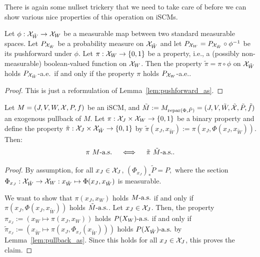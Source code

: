 There is again some nullset trickery that we need to take care of before we can show various nice properties of this operation on iSCMs.
\begin{Lem}\label{lem:pullback_as}
  Let $\phi : \mathcal{X}_{\tilde W} \to \mathcal{X}_W$ be a measurable map between two standard measurable spaces. 
  Let $P_{\mathcal{X}_{\tilde{W}}}$ be a probability measure on $\mathcal{X}_{\tilde{W}}$ and let $P_{\mathcal{X}_W} = P_{\mathcal{X}_{\tilde W}} \circ \phi^{-1}$ be its pushforward under $\phi$. 
  Let $\pi:\mathcal{X}_W\to\{0,1\}$ be a property, i.e., a (possibly non-measurable) boolean-valued function on $\mathcal{X}_W$. 
  Then the property $\tilde\pi = \pi\circ\phi$ on $\mathcal{X}_{\tilde{W}}$ holds $P_{\mathcal{X}_{\tilde{W}}}$-a.e.\ if and only if the property $\pi$ holds $P_{\mathcal{X}_W}$-a.e..
\end{Lem}
\begin{proof}
  This is just a reformulation of Lemma~\ref{lem:pushforward_as}.
\end{proof}
\begin{Cor}\label{cor:exog_pullback_as}
  Let $M = \left ( J, V, W, \mathcal{X}, P, f \right )$ be an iSCM, and $\tilde{M} := M_{\mathrm{repar}({\Phi},{\tilde{P}})} = ( J, V, \tilde{W}, \tilde{\mathcal{X}}, \tilde{P}, \tilde{f} )$ an exogenous pullback of $M$.
  Let $\pi : \mathcal{X}_J \times \mathcal{X}_W \to \{0,1\}$ be a binary property and define the property $\tilde\pi : \mathcal{X}_J \times \mathcal{X}_{\tilde{W}} \to \{0,1\}$ by $\tilde\pi(x_J,x_{\tilde{W}}) := \pi(x_J,\Phi(x_J,x_{\tilde W}))$.
  Then:
  $$\pi\ M\as \quad\iff\quad \tilde\pi\ \tilde{M}\as.$$
  \TODOmas
\end{Cor}
\begin{proof}
  By assumption, for all $x_J \in \mathcal{X}_J$, $(\Phi_{x_J})_* \tilde{P} = P,$ where the section $\Phi_{x_J} : \mathcal{X}_{\tilde{W}} \to \mathcal{X}_W : x_{\tilde W} \mapsto \Phi(x_J,x_{\tilde W})$ is measurable. 

  We want to show that
  $\pi(x_J,x_W)$ holds $M\text{-a.s.}$ if and only if $\pi(x_J,\Phi(x_J,x_{\tilde W}))$ holds $\tilde{M}\text{-a.s.}$.
  Let $x_J \in \mathcal{X}_J$.
  Then, the property $\pi_{x_J} := (x_W \mapsto \pi(x_J,x_W))$ holds $P(X_W)\text{-a.s.}$ if and only if $\tilde\pi_{x_J} := (x_{\tilde W} \mapsto \pi(x_J,\Phi_{x_J}(x_{\tilde W})))$ holds $P(X_{\tilde W})\text{-a.s.}$ by Lemma~\ref{lem:pullback_as}.
  Since this holds for all $x_J \in \mathcal{X}_J$, this proves the claim.
\end{proof}

